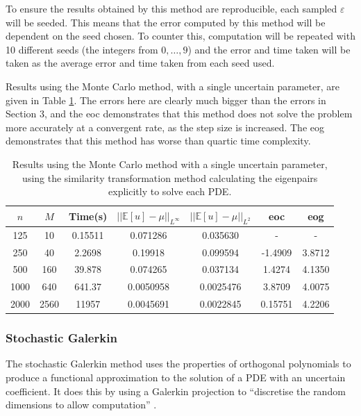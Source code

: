 \documentclass[11pt]{article}
\numberwithin{equation}{section}
\begin{document}
To ensure the results obtained by this method are reproducible, each sampled $\varepsilon$ will be seeded. This means that the error computed by this method will be dependent on the seed chosen. To counter this, computation will be repeated with 10 different seeds (the integers from $0, \dots, 9$) and the error and time taken will be taken as the average error and time taken from each seed used.

Results using the Monte Carlo method, with a single uncertain parameter, are given in Table \ref{table:monte carlo}. The errors here are clearly much bigger than the errors in Section 3, and the eoc demonstrates that this method does not solve the problem more accurately at a convergent rate, as the step size is increased. The eog demonstrates that this method has worse than quartic time complexity.
\begin{table}[H]
\centering
\begin{tabular}{|c|c|c|c|c|c|c|}
\hline
$n$ & $M$ & Time(s) & $|| \mathbb{E}[u] - \mu ||_{L^{\infty}}$ & $|| \mathbb{E}[u] - \mu ||_{L^{2}}$ & eoc & eog \\
\hline
125 & 10 & 0.15511 & 0.071286 & 0.035630 & - & - \\
250 & 40 & 2.2698 & 0.19918 & 0.099594 & -1.4909 & 3.8712 \\
500 & 160 & 39.878 & 0.074265 & 0.037134 & 1.4274 & 4.1350 \\
1000 & 640 & 641.37 & 0.0050958 & 0.0025476 & 3.8709 & 4.0075 \\
2000 & 2560 & 11957 & 0.0045691 & 0.0022845 & 0.15751 & 4.2206 \\
\hline
\end{tabular}
\captionsetup{justification=centering}
\caption{Results using the Monte Carlo method with a single uncertain parameter, using the similarity transformation method calculating the eigenpairs explicitly to solve each PDE.}
\label{table:monte carlo}
\end{table}


\subsubsection{Stochastic Galerkin}
The stochastic Galerkin method uses the properties of orthogonal polynomials to produce a functional approximation to the solution of a PDE with an uncertain coefficient. It does this by using a Galerkin projection to ``discretise the random dimensions to allow computation'' \cite{Paul}. 
\end{document}
